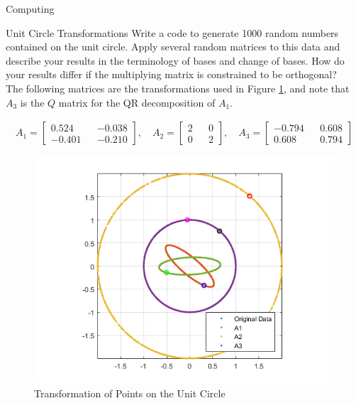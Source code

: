 \begin{section}{Computing}

\begin{homeworkSection}{Unit Circle Transformations}
Write a code to generate 1000 random numbers contained on the unit circle. Apply several random matrices to this data and describe your results in the terminology of bases and change of bases. How do your results differ if the multiplying matrix is constrained to be orthogonal?
 \\
 
The following matrices are the transformations used in Figure \ref{fig:unitCirc}, and note that $A_3$ is the $Q$ matrix for the QR decomposition of $A_1$.

\begin{align*}
    A_1 = \begin{bmatrix} 0.524 && -0.038 \\ -0.401 && -0.210 \end{bmatrix}, \quad
    A_2 = \begin{bmatrix} 2 && 0 \\ 0 && 2 \end{bmatrix}, \quad
    A_3 = \begin{bmatrix} -0.794 && 0.608 \\ 0.608 && 0.794\end{bmatrix}
\end{align*}
 
\begin{figure}[H]
\centering
\includegraphics[width=0.75\columnwidth]{../data/rand_unit_circ_pts} %
\caption{Transformation of Points on the Unit Circle}
\label{fig:unitCirc}
\end{figure}


\end{homeworkSection}
\end{section}
